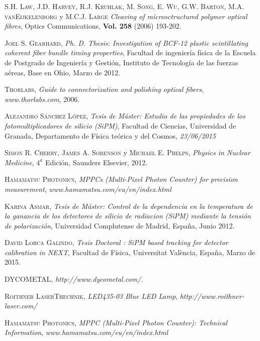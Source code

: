 \begin{thebibliography}{100}
 \textsc{S.H. Law}, \textsc{J.D. Harvey}, \textsc{R.J. Kruhlak}, \textsc{M. Song}, \textsc{E. Wu}, \textsc{G.W. Barton}, \textsc{M.A. vanEijkelenborg} y \textsc{M.C.J. Large}
\textit{Cleaving of microsctructured polymer optical fibres}, Optics Communications, \textbf{Vol. 258} (2006) 193-202.

 \textsc{Joel S. Gearhard},
\textit{ Ph. D. Thesis: Investigation of BCF-12 plastic scintillating coherent fiber bundle timing properties}, Facultad de ingeniería física de la Escuela de Postgrado de Ingeniería y Gestión, Instituto de Tecnología de las fuerzas aéreas, Base en Ohio, Marzo de 2012.

 \textsc{Thorlabs},
\textit{Guide to connectorization and polishing optical fibers}, \textit{www.thorlabs.com}, 2006.

 \textsc{Alejandro Sánchez López},
\textit{Tesis de Máster: Estudio de las propiedades de los fotomultiplicadores de silicio (SiPM)}, Facultad de Ciencias, Universidad de Granada, Departamento de Física teórica y del Cosmos, \textit{23/06/2015}

 \textsc{Simon R. Cherry}, \textsc{James A. Sorenson} y \textsc{Michael E. Phelps},
\textit{Physics in Nuclear Medicine}, $4^a$ Edición, Saunders Elsevier, 2012.

 \textsc{Hamamatsu Photonics},
\textit{MPPCs (Multi-Pixel Photon Counter) for precision measurement}, \textit{www.hamamatsu.com/eu/en/index.html}

 \textsc{Karina Asmar},
\textit{Tesis de Máster: Control de la dependencia en la temperatura de la ganancia de los detectores de silicio de radiacion (SiPM) mediante la tensión de polarización}, Universidad Complutense de Madrid, España, Junio 2012.

 \textsc{David Lorca Galindo},
\textit{Tesis Doctoral : SiPM based tracking for detector calibration in NEXT}, Facultad de Física, Universitat  València, España, Marzo de 2015.

 \textsc{DYCOMETAL},
\textit{http://www.dycometal.com/}.

 \textsc{Roithner LaserThechnik},
\textit{LED435-03 Blue LED Lamp}, \textit{http://www.roithner-laser.com/}

 \textsc{Hamamatsu Photonics},
\textit{MPPC (Multi-Pixel Photon Counter): Technical Information}, \textit{www.hamamatsu.com/eu/en/index.html}


\end{thebibliography}
